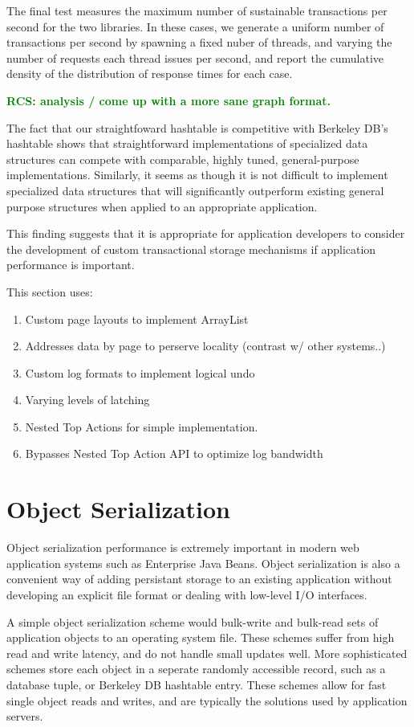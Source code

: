 \documentclass[letterpaper,twocolumn,english]{article}
\newcommand{\rcs}[1]{\textcolor{green}{\bf RCS: #1}}
\begin{document}
The final test measures the maximum number of sustainable transactions
per second for the two libraries.  In these cases, we generate a
uniform number of transactions per second by spawning a fixed nuber of
threads, and varying the number of requests each thread issues per
second, and report the cumulative density of the distribution of
response times for each case.

\rcs{analysis / come up with a more sane graph format.}

The fact that our straightfoward hashtable is competitive with Berkeley DB's hashtable shows that
straightforward implementations of specialized data structures can 
compete with comparable, highly tuned, general-purpose implementations.  
Similarly, it seems as though it is not difficult to implement specialized 
data structures that will significantly outperform existing 
general purpose structures when applied to an appropriate application.

This finding suggests that it is appropriate for
application developers to consider the development of custom
transactional storage mechanisms if application performance is
important.

This section uses:
\begin{enumerate}
\item{Custom page layouts to implement ArrayList}
\item{Addresses data by page to perserve locality (contrast w/ other systems..)}
\item{Custom log formats to implement logical undo}
\item{Varying levels of latching}
\item{Nested Top Actions for simple implementation.}
\item{Bypasses Nested Top Action API to optimize log bandwidth}
\end{enumerate}

\section{Object Serialization}
\label{OASYS}

Object serialization performance is extremely important in modern web
application systems such as Enterprise Java Beans.  Object
serialization is also a convenient way of adding persistant storage to
an existing application without developing an explicit file format or
dealing with low-level I/O interfaces.

A simple object serialization scheme would bulk-write and bulk-read
sets of application objects to an operating system file.  These
schemes suffer from high read and write latency, and do not handle
small updates well.  More sophisticated schemes store each object in a
seperate randomly accessible record, such as a database tuple, or
Berkeley DB hashtable entry.  These schemes allow for fast single
object reads and writes, and are typically the solutions used by
application servers.
\end{document}
